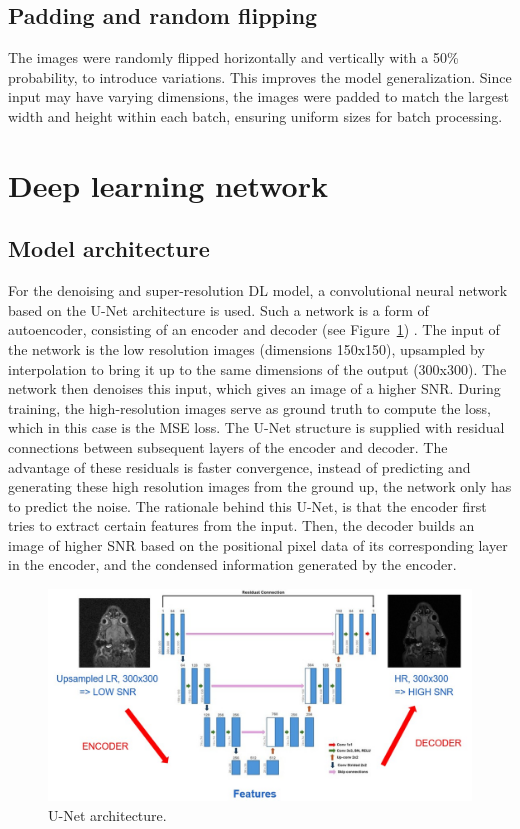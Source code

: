 \documentclass[twocolumn]{article}
\begin{document}
\subsection{Padding and random flipping}
The images were randomly flipped horizontally and vertically with a 50\% probability, to introduce variations. This improves the model generalization. Since input may have varying dimensions, the images were padded to match the largest width and height within each batch, ensuring uniform sizes for batch processing.


\section{Deep learning network}
\subsection{Model architecture}
For the denoising and super-resolution DL model, a convolutional neural network based on the U-Net architecture is used. Such a network is a form of autoencoder, consisting of an encoder and decoder (see Figure~\ref{fig:U-Net}) \cite{ronneberger2015unet}.
The input of the network is the low resolution images (dimensions 150x150), upsampled by interpolation to bring it up to the same dimensions of the output (300x300). The network then denoises this input, which gives an image of a higher SNR. During training, the high-resolution images serve as ground truth to compute the loss, which in this case is the MSE loss. 
The U-Net structure is supplied with residual connections between subsequent layers of the encoder and decoder. The advantage of these residuals is faster convergence, instead of predicting and generating these high resolution images from the ground up, the network only has to predict the noise. 
The rationale behind this U-Net, is that the encoder first tries to extract certain features from the input. Then, the decoder builds an image of higher SNR based on the positional pixel data of its corresponding layer in the encoder, and the condensed information generated by the encoder. 

\begin{figure}
    \centering
    \includegraphics[width=0.85\linewidth]{U-Net.jpg}
    \caption{U-Net architecture.}
    \label{fig:U-Net}
\end{figure}
\end{document}
